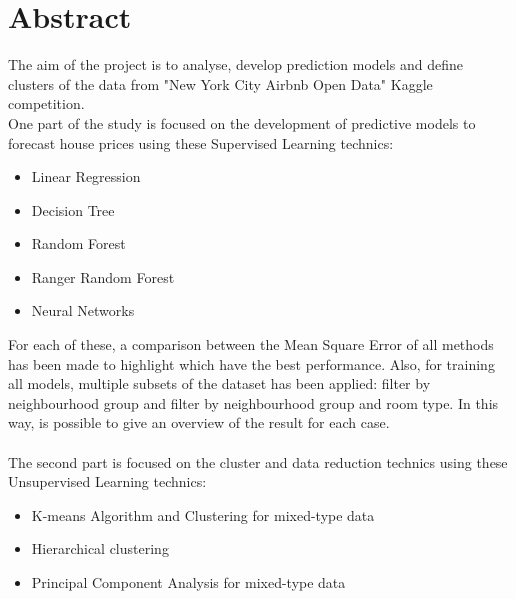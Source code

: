\documentclass{FR16}
\begin{document}
\maketitle

\newpage
\tableofcontents
\newpage
\listoffigures
\newpage
\section{Abstract}
The aim of the project is to analyse, develop prediction models and define  clusters of the data from "New York City Airbnb Open Data" Kaggle competition.
\\ One part of the study is focused on the development of predictive models to forecast house prices using these Supervised Learning technics:\begin{itemize}
\itemsep0em 
\item Linear Regression
\item Decision Tree
\item Random Forest
\item Ranger Random Forest
\item Neural Networks
\end{itemize}
For each of these, a comparison between the Mean Square Error of all methods has been made to highlight which have the best performance. Also, for training all models, multiple subsets of the dataset has been applied: filter by neighbourhood group and filter by neighbourhood group and room type. In this way, is possible to give an overview of the result for each case.\\\\
The second part is focused on the cluster and data reduction technics using these Unsupervised Learning technics:
\begin{itemize}
\itemsep0em
\item K-means Algorithm and Clustering for mixed-type data
\item Hierarchical clustering
\item Principal Component Analysis for mixed-type data
\end{itemize}
\end{document}

